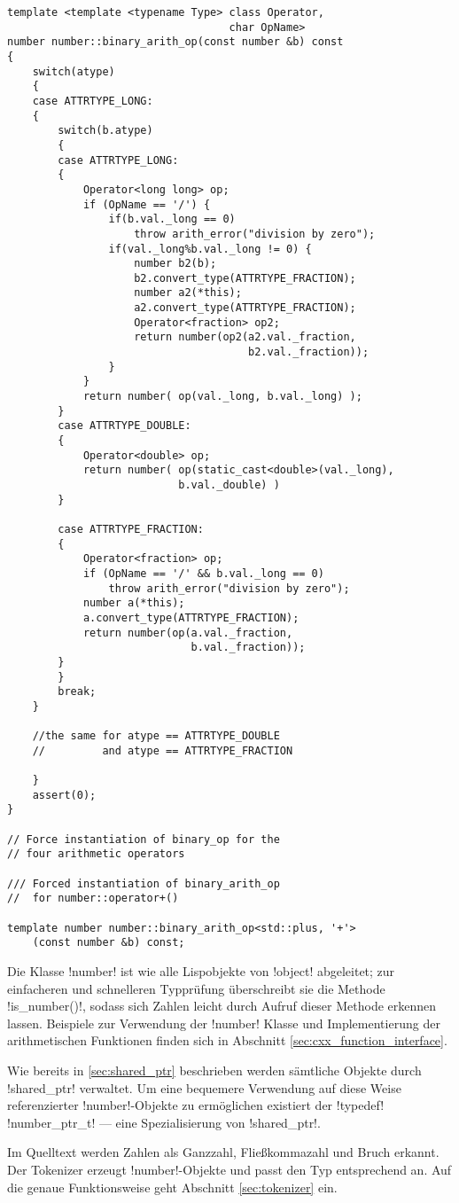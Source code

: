 \begin{lstlisting}[caption={Arithmetische Operatoren}, label=lst:op_template]
template <template <typename Type> class Operator,
                                   char OpName>
number number::binary_arith_op(const number &b) const
{
    switch(atype)
    {
    case ATTRTYPE_LONG:
    {
        switch(b.atype)
        {
        case ATTRTYPE_LONG:
        {
            Operator<long long> op;
            if (OpName == '/') {
                if(b.val._long == 0)
                    throw arith_error("division by zero");
                if(val._long%b.val._long != 0) {
                    number b2(b);
                    b2.convert_type(ATTRTYPE_FRACTION);
                    number a2(*this);
                    a2.convert_type(ATTRTYPE_FRACTION);
                    Operator<fraction> op2;
                    return number(op2(a2.val._fraction,
                                      b2.val._fraction));
                }
            }
            return number( op(val._long, b.val._long) );
        }
        case ATTRTYPE_DOUBLE:
        {
            Operator<double> op;
            return number( op(static_cast<double>(val._long),
                           b.val._double) )
        }

        case ATTRTYPE_FRACTION:
        {
            Operator<fraction> op;
            if (OpName == '/' && b.val._long == 0)
                throw arith_error("division by zero");
            number a(*this);
            a.convert_type(ATTRTYPE_FRACTION);
            return number(op(a.val._fraction,
                             b.val._fraction));
        }
        }
        break;
    }

    //the same for atype == ATTRTYPE_DOUBLE
    //         and atype == ATTRTYPE_FRACTION

    }
    assert(0);
}

// Force instantiation of binary_op for the
// four arithmetic operators

/// Forced instantiation of binary_arith_op
//  for number::operator+()

template number number::binary_arith_op<std::plus, '+'>
    (const number &b) const;
\end{lstlisting}

Die Klasse !number! ist wie alle Lispobjekte von !object! abgeleitet; zur einfacheren und schnelleren Typprüfung überschreibt sie die Methode !is_number()!, sodass sich Zahlen leicht durch Aufruf dieser Methode erkennen lassen. Beispiele zur Verwendung der !number! Klasse und Implementierung der arithmetischen Funktionen finden sich in Abschnitt \ref{sec:cxx_function_interface}.

Wie bereits in \ref{sec:shared_ptr} beschrieben werden sämtliche Objekte durch !shared_ptr! verwaltet. Um eine bequemere Verwendung auf diese Weise referenzierter !number!-Objekte zu ermöglichen existiert der !typedef! !number_ptr_t! --- eine Spezialisierung von !shared_ptr!.

Im Quelltext werden Zahlen als Ganzzahl, Fließkommazahl und Bruch erkannt. Der Tokenizer erzeugt !number!-Objekte und passt den Typ entsprechend an. Auf die genaue Funktionsweise geht Abschnitt \ref{sec:tokenizer} ein.